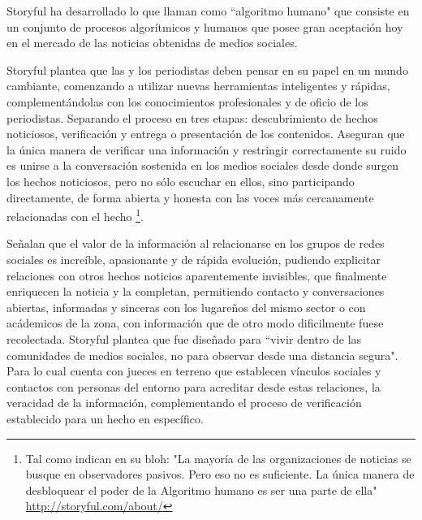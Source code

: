 
Storyful ha desarrollado lo que llaman como ``algoritmo humano" que consiste en un conjunto de procesos algorítmicos y humanos que posee gran aceptación hoy en el mercado de las noticias obtenidas de medios sociales. 

Storyful plantea que las y los periodistas deben pensar en su papel en un mundo cambiante, comenzando a utilizar nuevas herramientas inteligentes y rápidas, complementándolas con los conocimientos profesionales y de oficio de los periodistas. Separando el proceso en tres etapas: descubrimiento de hechos noticiosos, verificación y entrega o presentación de los contenidos. Aseguran que la única manera de verificar una información y restringir correctamente su ruido es unirse a la conversación sostenida en los medios sociales desde donde surgen los hechos noticiosos,  pero no sólo escuchar en ellos, sino participando directamente, de forma abierta y honesta con las voces más cercanamente relacionadas con el hecho \footnote{Tal como indican en su bloh: "La mayoría de las organizaciones de noticias se busque en observadores pasivos. Pero eso no es suficiente. La única manera de desbloquear el poder de la Algoritmo humano es ser una parte de ella" \url{http://storyful.com/about/}}.

Señalan que el valor de la información al relacionarse en los grupos de redes sociales es increíble, apasionante y de rápida evolución, pudiendo explicitar relaciones con otros hechos noticios aparentemente invisibles, que finalmente enriquecen la noticia y la completan, permitiendo contacto y conversaciones abiertas, informadas y sinceras con los lugareños del mismo sector o con acádemicos de la zona, con información que de otro modo dificilmente fuese recolectada. Storyful plantea que fue diseñado para ``vivir dentro de las comunidades de medios sociales, no para observar desde una distancia segura". Para lo cual cuenta con jueces en terreno que establecen vínculos sociales y contactos con personas del entorno para acreditar desde estas relaciones, la veracidad de la información, complementando el proceso de verificación establecido para un hecho en específico.


